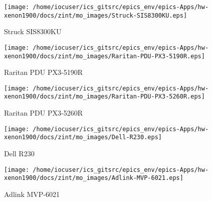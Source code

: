 \noindent
\vspace{1.4cm}
\begin{minipage}{.2\textwidth}
\begin{center}
\texttt{[image: /home/iocuser/ics\_gitsrc/epics\_env/epics-Apps/hw-xenon1900/docs/zint/mo\_images/Struck-SIS8300KU.eps]}
\end{center}
\end{minipage}
\begin{minipage}{.7\textwidth}
Struck SIS8300KU
\end{minipage}


\noindent
\vspace{1.4cm}
\begin{minipage}{.2\textwidth}
\begin{center}
\texttt{[image: /home/iocuser/ics\_gitsrc/epics\_env/epics-Apps/hw-xenon1900/docs/zint/mo\_images/Raritan-PDU-PX3-5190R.eps]}
\end{center}
\end{minipage}
\begin{minipage}{.7\textwidth}
Raritan PDU PX3-5190R
\end{minipage}


\noindent
\vspace{1.4cm}
\begin{minipage}{.2\textwidth}
\begin{center}
\texttt{[image: /home/iocuser/ics\_gitsrc/epics\_env/epics-Apps/hw-xenon1900/docs/zint/mo\_images/Raritan-PDU-PX3-5260R.eps]}
\end{center}
\end{minipage}
\begin{minipage}{.7\textwidth}
Raritan PDU PX3-5260R
\end{minipage}


\noindent
\vspace{1.4cm}
\begin{minipage}{.2\textwidth}
\begin{center}
\texttt{[image: /home/iocuser/ics\_gitsrc/epics\_env/epics-Apps/hw-xenon1900/docs/zint/mo\_images/Dell-R230.eps]}
\end{center}
\end{minipage}
\begin{minipage}{.7\textwidth}
Dell R230
\end{minipage}


\noindent
\vspace{1.4cm}
\begin{minipage}{.2\textwidth}
\begin{center}
\texttt{[image: /home/iocuser/ics\_gitsrc/epics\_env/epics-Apps/hw-xenon1900/docs/zint/mo\_images/Adlink-MVP-6021.eps]}
\end{center}
\end{minipage}
\begin{minipage}{.7\textwidth}
Adlink MVP-6021
\end{minipage}



